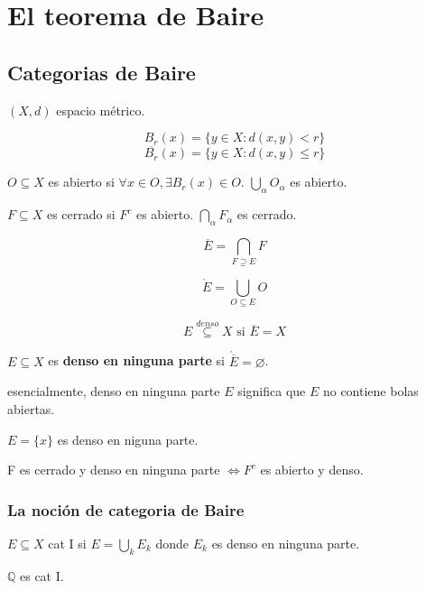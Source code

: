 \section{El teorema de Baire}

\subsection{Categorias de Baire}

$(X,d)$ espacio métrico.

\[B_r(x)=\{y\in X:d(x,y)<r\}\]
\[\overline{B_r}(x)=\{y\in X:d(x,y)\leq r\}\]

$O\subseteq X$ es abierto si $\forall x\in O,\exists B_r(x)\in O$. $\bigcup_\alpha O_\alpha$ es abierto.

$F\subseteq X$ es cerrado si $F^c$ es abierto. $\bigcap_\alpha F_\alpha$ es cerrado.

\[\overline{E}=\bigcap_{F\supseteq E} F\]

\[\mathring{E}=\bigcup_{O\subseteq E}O\]

\[E\overset{denso}{\subseteq} X \text{ si }\overline{E}=X\]


\begin{fdefinition}
    $E\subseteq X$ es \textbf{denso en ninguna parte} si $\mathring{\overline{E}}=\varnothing$.
\end{fdefinition}

esencialmente, denso en ninguna parte $E$ significa que $E$ no contiene bolas abiertas.

\begin{fexample}
    $E=\{x\}$ es denso en niguna parte.
\end{fexample}

\begin{fproposition}
    F es cerrado y denso en ninguna parte $\iff F^c$ es abierto y denso.
\end{fproposition}

\subsubsection*{La noción de categoria de Baire}

\begin{fdefinition}
    $E\subseteq X$ cat I si $E=\bigcup_{k}E_k$ donde $E_k$ es denso en ninguna parte.
\end{fdefinition}

\begin{fexample}
    $\mathbb{Q}$ es cat I.
\end{fexample}

